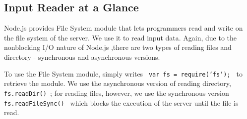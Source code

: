 \subsection{Input Reader at a Glance}

Node.js provides File System module that lets programmers read and write on the file system of the server. We use it to read input data. Again, due to the nonblocking I/O nature of Node.js ,there are two types of reading files and directory - synchronous and asynchronous versions.

To use the File System module, simply writes \texttt{ var fs = require('fs'); } to retrieve the module. We use the asynchronous version of reading directory, \texttt{ fs.readDir() }; for reading files, however, we use the synchronous version \texttt{ fs.readFileSync() } which blocks the execution of the server until the file is read.
